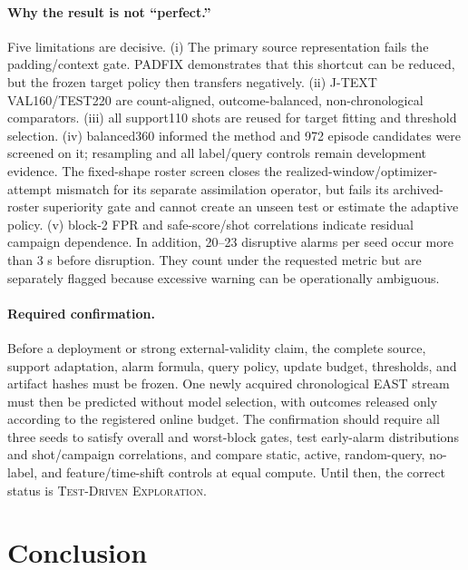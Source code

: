 \documentclass[10pt,twocolumn]{article}
\newcommand{\jtext}{J-TEXT}
\newcommand{\east}{EAST}
\newcommand{\devstatus}{\textsc{Test-Driven Exploration}}
\begin{document}
\paragraph{Why the result is not ``perfect.''}
Five limitations are decisive.  (i) The primary source representation fails the padding/context gate.  PADFIX demonstrates that this shortcut can be reduced, but the frozen target policy then transfers negatively.  (ii) \jtext{} VAL160/TEST220 are count-aligned, outcome-balanced, non-chronological comparators.  (iii) all support110 shots are reused for target fitting and threshold selection.  (iv) balanced360 informed the method and 972 episode candidates were screened on it; resampling and all label/query controls remain development evidence.  The fixed-shape roster screen closes the realized-window/optimizer-attempt mismatch for its separate assimilation operator, but fails its archived-roster superiority gate and cannot create an unseen test or estimate the adaptive policy.  (v) block-2 FPR and safe-score/shot correlations indicate residual campaign dependence.  In addition, 20--23 disruptive alarms per seed occur more than 3 s before disruption.  They count under the requested metric but are separately flagged because excessive warning can be operationally ambiguous.

\paragraph{Required confirmation.}
Before a deployment or strong external-validity claim, the complete source, support adaptation, alarm formula, query policy, update budget, thresholds, and artifact hashes must be frozen.  One newly acquired chronological \east{} stream must then be predicted without model selection, with outcomes released only according to the registered online budget.  The confirmation should require all three seeds to satisfy overall and worst-block gates, test early-alarm distributions and shot/campaign correlations, and compare static, active, random-query, no-label, and feature/time-shift controls at equal compute.  Until then, the correct status is \devstatus{}.

\section{Conclusion}
\end{document}
